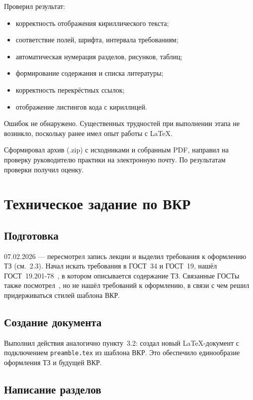 \documentclass[a4paper,14pt]{extarticle}
\begin{document}
Проверил результат:
\begin{itemize}
  \item корректность отображения кириллического текста;
  \item соответствие полей, шрифта, интервала требованиям;
  \item автоматическая нумерация разделов, рисунков, таблиц;
  \item формирование содержания и списка литературы;
  \item корректность перекрёстных ссылок;
  \item отображение листингов кода с кириллицей.
\end{itemize}

Ошибок не обнаружено. Существенных трудностей при выполнении этапа не возникло, поскольку ранее имел опыт работы с \LaTeX{}.

Сформировал архив (.zip) с исходниками и собранным PDF, направил на проверку руководителю практики на электронную почту. По результатам проверки получил оценку.

\newpage

\section{Техническое задание по ВКР}

\subsection{Подготовка}

07.02.2026 --- пересмотрел запись лекции и выделил требования к оформлению ТЗ (см.~2.3). Начал искать требования в ГОСТ~34 и ГОСТ~19, нашёл ГОСТ~19.201-78~\cite{gost19201}, в котором описывается содержание ТЗ. Связанные ГОСТы также посмотрел~\cite{gost34602}, но не нашёл требований к оформлению, в связи с чем решил придерживаться стилей шаблона ВКР.

\subsection{Создание документа}

Выполнил действия аналогично пункту~3.2: создал новый \LaTeX{}-документ с подключением \texttt{preamble.tex} из шаблона ВКР. Это обеспечило единообразие оформления ТЗ и будущей ВКР.

\subsection{Написание разделов}
\end{document}
